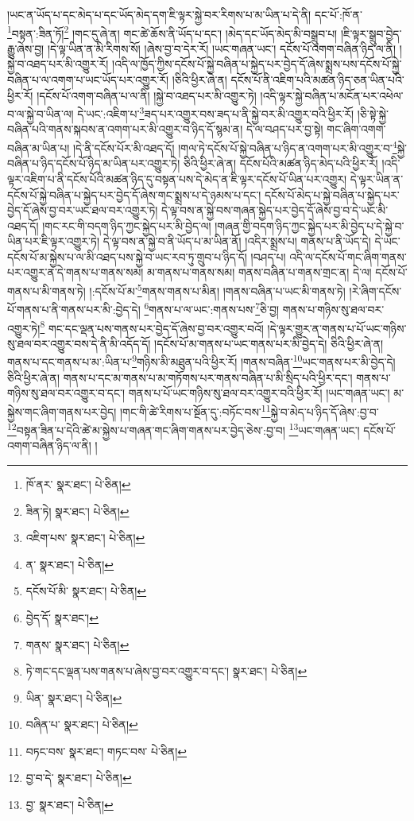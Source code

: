 །ཡང་ན་ཡོད་པ་དང་མེད་པ་དང་ཡོད་མེད་དག་ཇི་ལྟར་སྐྱེ་བར་རིགས་པ་མ་ཡིན་པ་དེ་ནི། དང་པོ་:ཁོ་ན་\footnote{ཁོ་ནར་  སྣར་ཐང་།  པེ་ཅིན། }བསྟན་:ཟིན་ཏོ།\footnote{ཟིན་ཏེ།  སྣར་ཐང་།  པེ་ཅིན། } །གང་དུ་ཞེ་ན། གང་ཚེ་ཆོས་ནི་ཡོད་པ་དང་། །མེད་དང་ཡོད་མེད་མི་བསྒྲུབ་པ། །ཇི་ལྟར་སྒྲུབ་བྱེད་རྒྱུ་ཞེས་བྱ། །དེ་ལྟ་ཡིན་ན་མི་རིགས་སོ། །ཞེས་བྱ་བ་དེར་རོ། །ཡང་གཞན་ཡང་། དངོས་པོ་འགག་བཞིན་ཉིད་ལ་ནི། །སྐྱེ་བ་འཐད་པར་མི་འགྱུར་རོ། །འདི་ལ་ཁྱོད་ཀྱིས་དངོས་པོ་སྐྱེ་བཞིན་པ་སྐྱེད་པར་བྱེད་དོ་ཞེས་སྨྲས་པས་དངོས་པོ་སྐྱེ་བཞིན་པ་ལ་འགག་པ་ཡང་ཡོད་པར་འགྱུར་རོ། །ཅིའི་ཕྱིར་ཞེ་ན། དངོས་པོ་ནི་འཇིག་པའི་མཚན་ཉིད་ཅན་ཡིན་པའི་ཕྱིར་རོ། །དངོས་པོ་འགག་བཞིན་པ་ལ་ནི། །སྐྱེ་བ་འཐད་པར་མི་འགྱུར་ཏེ། །འདི་ལྟར་སྐྱེ་བཞིན་པ་མངོན་པར་འཕེལ་བ་ལ་སྐྱེ་བ་ཡིན་ལ། དེ་ཡང་:འཇིག་པ་\footnote{འཇིག་པས་  སྣར་ཐང་།  པེ་ཅིན། }ཟད་པར་འགྱུར་བས་ཟད་པ་ནི་སྐྱེ་བར་མི་འགྱུར་བའི་ཕྱིར་རོ། །ཅི་སྟེ་སྐྱེ་བཞིན་པའི་གནས་སྐབས་ན་འགག་པར་མི་འགྱུར་བ་ཉིད་དོ་སྙམ་ན། དེ་ལ་བཤད་པར་བྱ་སྟེ། གང་ཞིག་འགག་བཞིན་མ་ཡིན་པ། །དེ་ནི་དངོས་པོར་མི་འཐད་དོ། །གལ་ཏེ་དངོས་པོ་སྐྱེ་བཞིན་པ་ཉིད་ན་འགག་པར་མི་འགྱུར་བ་\footnote{ན་  སྣར་ཐང་།  པེ་ཅིན། }སྐྱེ་བཞིན་པ་ཉིད་དངོས་པོ་ཉིད་མ་ཡིན་པར་འགྱུར་ཏེ། ཅིའི་ཕྱིར་ཞེ་ན། དངོས་པོའི་མཚན་ཉིད་མེད་པའི་ཕྱིར་རོ། །འདི་ལྟར་འཇིག་པ་ནི་དངོས་པོའི་མཚན་ཉིད་དུ་བསྟན་པས་དེ་མེད་ན་ཇི་ལྟར་དངོས་པོ་ཡིན་པར་འགྱུར། དེ་ལྟར་ཡིན་ན་དངོས་པོ་སྐྱེ་བཞིན་པ་སྐྱེད་པར་བྱེད་དོ་ཞེས་གང་སྨྲས་པ་དེ་ཉམས་པ་དང་། དངོས་པོ་མེད་པ་སྐྱེ་བཞིན་པ་སྐྱེད་པར་བྱེད་དོ་ཞེས་བྱ་བར་ཡང་ཐལ་བར་འགྱུར་ཏེ། དེ་ལྟ་བས་ན་སྐྱེ་བས་གཞན་སྐྱེད་པར་བྱེད་དོ་ཞེས་བྱ་བ་དེ་ཡང་མི་འཐད་དོ། །གང་རང་གི་བདག་ཉིད་ཀྱང་སྐྱེད་པར་མི་བྱེད་ལ། །གཞན་གྱི་བདག་ཉིད་ཀྱང་སྐྱེད་པར་མི་བྱེད་པ་དེ་སྐྱེ་བ་ཡིན་པར་ཇི་ལྟར་འགྱུར་ཏེ། དེ་ལྟ་བས་ན་སྐྱེ་བ་ནི་ཡོད་པ་མ་ཡིན་ནོ། །འདིར་སྨྲས་པ། གནས་པ་ནི་ཡོད་དེ། དེ་ཡང་དངོས་པོ་མ་སྐྱེས་པ་ལ་མི་འཐད་པས་སྐྱེ་བ་ཡང་རབ་ཏུ་གྲུབ་པ་ཉིད་དོ། །བཤད་པ། འདི་ལ་དངོས་པོ་གང་ཞིག་གནས་པར་འགྱུར་ན་དེ་གནས་པ་གནས་སམ། མ་གནས་པ་གནས་སམ། གནས་བཞིན་པ་གནས་གྲང་ན། དེ་ལ། དངོས་པོ་གནས་པ་མི་གནས་ཏེ། །:དངོས་པོ་མ་\footnote{དངོས་པོ་མི་  སྣར་ཐང་།  པེ་ཅིན། }གནས་གནས་པ་མིན། །གནས་བཞིན་པ་ཡང་མི་གནས་ཏེ། །རེ་ཞིག་དངོས་པོ་གནས་པ་ནི་གནས་པར་མི་:བྱེད་དེ། \footnote{བྱེད་དོ་  སྣར་ཐང་། }གནས་པ་ལ་ཡང་:གནས་པས་\footnote{གནས་  སྣར་ཐང་།  པེ་ཅིན། }ཅི་བྱ། གནས་པ་གཉིས་སུ་ཐལ་བར་འགྱུར་ཏེ།\footnote{ཏེ་གང་དང་ལྡན་པས་གནས་པ་ཞེས་བྱ་བར་འགྱུར་བ་དང་།  སྣར་ཐང་།  པེ་ཅིན། } གང་དང་ལྡན་པས་གནས་པར་བྱེད་དོ་ཞེས་བྱ་བར་འགྱུར་བའོ། །དེ་ལྟར་གྱུར་ན་གནས་པ་པོ་ཡང་གཉིས་སུ་ཐལ་བར་འགྱུར་བས་དེ་ནི་མི་འདོད་དོ། །དངོས་པོ་མ་གནས་པ་ཡང་གནས་པར་མི་བྱེད་དེ། ཅིའི་ཕྱིར་ཞེ་ན། གནས་པ་དང་གནས་པ་མ་:ཡིན་པ་\footnote{ཡིན་  སྣར་ཐང་།  པེ་ཅིན། }གཉིས་མི་མཐུན་པའི་ཕྱིར་རོ། །གནས་བཞིན་\footnote{བཞིན་པ་  སྣར་ཐང་།  པེ་ཅིན། }ཡང་གནས་པར་མི་བྱེད་དེ། ཅིའི་ཕྱིར་ཞེ་ན། གནས་པ་དང་མ་གནས་པ་མ་གཏོགས་པར་གནས་བཞིན་པ་མི་སྲིད་པའི་ཕྱིར་དང་། གནས་པ་གཉིས་སུ་ཐལ་བར་འགྱུར་བ་དང་། གནས་པ་པོ་ཡང་གཉིས་སུ་ཐལ་བར་འགྱུར་བའི་ཕྱིར་རོ། །ཡང་གཞན་ཡང་། མ་སྐྱེས་གང་ཞིག་གནས་པར་བྱེད། །གང་གི་ཚེ་རིགས་པ་སྔོན་དུ་:བཏོང་བས་\footnote{བཏང་བས་  སྣར་ཐང་། གཏང་བས་  པེ་ཅིན། }སྐྱེ་བ་མེད་པ་ཉིད་དོ་ཞེས་:བྱ་བ་\footnote{བྱ་བ་དེ་  སྣར་ཐང་།  པེ་ཅིན། }བསྟན་ཟིན་པ་དེའི་ཚེ་མ་སྐྱེས་པ་གཞན་གང་ཞིག་གནས་པར་བྱེད་ཅེས་:བྱ་བ། \footnote{བྱ་  སྣར་ཐང་།  པེ་ཅིན། }ཡང་གཞན་ཡང་། དངོས་པོ་འགག་བཞིན་ཉིད་ལ་ནི། །
